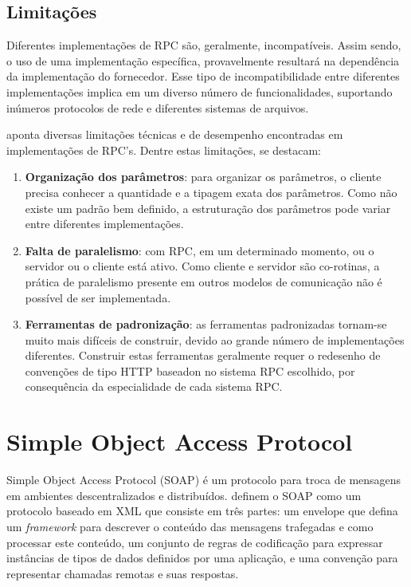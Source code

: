 \subsection{Limitações}

Diferentes implementações de RPC são, geralmente, incompatíveis. Assim sendo, o uso de uma implementação específica, provavelmente resultará na dependência da implementação do fornecedor. Esse tipo de incompatibilidade entre diferentes implementações implica em um diverso número de funcionalidades, suportando inúmeros protocolos de rede e diferentes sistemas de arquivos.

 aponta diversas limitações técnicas e de desempenho encontradas em implementações de RPC's. Dentre estas limitações, se destacam:

\begin{enumerate}[label=\alph*)]

\item \textbf{Organização dos parâmetros}: para organizar os parâmetros, o cliente precisa conhecer a quantidade e a tipagem exata dos parâmetros. Como não existe um padrão bem definido, a estruturação dos parâmetros pode variar entre diferentes implementações.

\item \textbf{Falta de paralelismo}: com RPC, em um determinado momento, ou o servidor ou o cliente está ativo. Como cliente e servidor são co-rotinas, a prática de paralelismo presente em outros modelos de comunicação não é possível de ser implementada.

\item \textbf{Ferramentas de padronização}: as ferramentas padronizadas tornam-se muito mais difíceis de construir, devido ao grande número de implementações diferentes. Construir estas ferramentas geralmente requer o redesenho de convenções de tipo HTTP baseadon no sistema RPC escolhido, por consequência da especialidade de cada sistema RPC.

\end{enumerate}

\section{Simple Object Access Protocol}\label{sec:soap}

Simple Object Access Protocol (SOAP) é um protocolo para troca de mensagens em ambientes descentralizados e distribuídos.  definem o SOAP como 
um protocolo baseado em XML que consiste em três partes: um envelope que defina um \textit{framework} para descrever o conteúdo das mensagens trafegadas e como processar este conteúdo, um conjunto de regras de codificação para expressar instâncias de tipos de dados definidos por uma aplicação, e uma convenção para representar chamadas remotas e suas respostas.

